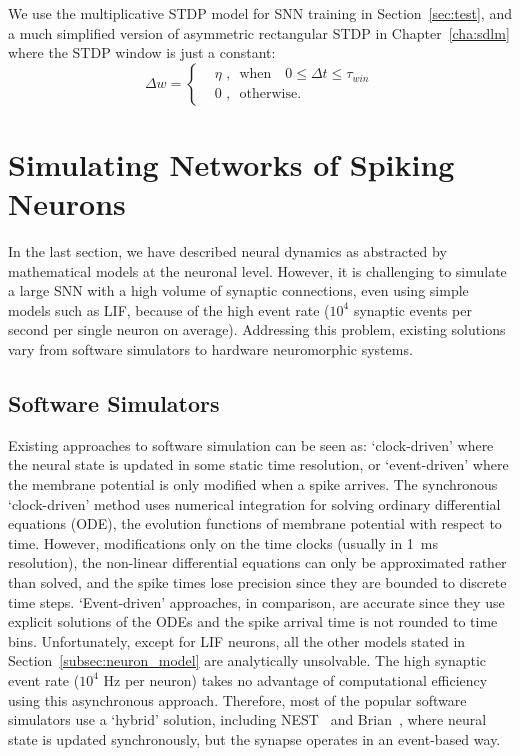 We use the multiplicative STDP model for SNN training in Section~\ref{sec:test}, and a much simplified version of asymmetric rectangular STDP in Chapter~\ref{cha:sdlm} where the STDP window is just a constant:
\begin{equation}
\Delta w = \left\{
\begin{aligned}
&\eta \textrm{~,~~when~~~} 0 \leq \Delta  t \leq \tau_{win}\\
& 0 \textrm{~,~~otherwise}.
\end{aligned}
\right.
\end{equation}

\section{Simulating Networks of Spiking Neurons}
\label{sec:snn_sim}
In the last section, we have described neural dynamics as abstracted by mathematical models at the neuronal level.
However, it is challenging to simulate a large SNN with a high volume of synaptic connections, even using simple models such as LIF, because of the high event rate ($10^4$ synaptic events per second per single neuron on average).
Addressing this problem, existing solutions vary from software simulators to hardware neuromorphic systems.

\subsection{Software Simulators}
Existing approaches to software simulation can be seen as: `clock-driven' where the neural state is updated in some static time resolution, or `event-driven' where the membrane potential is only modified when a spike arrives.
The synchronous `clock-driven' method uses numerical integration for solving ordinary differential equations (ODE), the evolution functions of membrane potential with respect to time.
However, modifications only on the time clocks (usually in 1~ms resolution), the non-linear differential equations can only be approximated rather than solved, and the spike times lose precision since they are bounded to discrete time steps.
`Event-driven' approaches, in comparison, are accurate since they use explicit solutions of the ODEs and the spike arrival time is not rounded to time bins.
Unfortunately, except for LIF neurons, all the other models stated in Section~\ref{subsec:neuron_model} are analytically unsolvable.
The high synaptic event rate ($10^4$ Hz per neuron) takes no advantage of computational efficiency using this asynchronous approach.
Therefore, most of the popular software simulators use a `hybrid' solution, including NEST~\citep{gewaltig2007nest} and Brian~\citep{goodman2008brian}, where 
neural state is updated synchronously, but the synapse operates in an event-based way.

